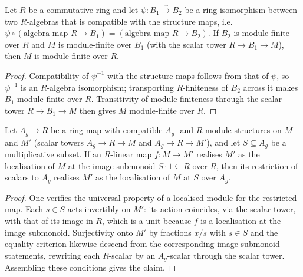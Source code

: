 \begin{lemma}
  \label{lem:gf_finite_of_quotient_ringequiv}
  Let \(R\) be a commutative ring and let \(\psi : B_1 \xrightarrow{\sim} B_2\) be a ring
  isomorphism between two \(R\)-algebras that is compatible with the structure maps, i.e.\
  \(\psi \circ (\text{algebra map } R \to B_1) = (\text{algebra map } R \to B_2)\). If
  \(B_2\) is module-finite over \(R\) and \(M\) is module-finite over \(B_1\) (with the
  scalar tower \(R \to B_1 \to M\)), then \(M\) is module-finite over \(R\).
\end{lemma}
\begin{proof}

\leanok
  Compatibility of \(\psi^{-1}\) with the structure maps follows from that of \(\psi\), so
  \(\psi^{-1}\) is an \(R\)-algebra isomorphism; transporting \(R\)-finiteness of \(B_2\)
  across it makes \(B_1\) module-finite over \(R\). Transitivity of module-finiteness through
  the scalar tower \(R \to B_1 \to M\) then gives \(M\) module-finite over \(R\).
\end{proof}

\begin{lemma}
  \label{lem:gf_islocalizedmodule_restrictscalars}
  Let \(A_g \to R\) be a ring map with compatible \(A_g\)- and \(R\)-module structures on
  \(M\) and \(M'\) (scalar towers \(A_g \to R \to M\) and \(A_g \to R \to M'\)), and let
  \(S \subseteq A_g\) be a multiplicative subset. If an \(R\)-linear map
  \(f : M \to M'\) realises \(M'\) as the localisation of \(M\) at the image submonoid
  \(S \cdot 1 \subseteq R\) over \(R\), then its restriction of scalars to \(A_g\) realises
  \(M'\) as the localisation of \(M\) at \(S\) over \(A_g\).
\end{lemma}
\begin{proof}

\leanok
  One verifies the universal property of a localised module for the restricted map. Each
  \(s \in S\) acts invertibly on \(M'\): its action coincides, via the scalar tower, with
  that of its image in \(R\), which is a unit because \(f\) is a localisation at the image
  submonoid. Surjectivity onto \(M'\) by fractions \(x/s\) with \(s \in S\) and the
  equality criterion likewise descend from the corresponding image-submonoid statements,
  rewriting each \(R\)-scalar by an \(A_g\)-scalar through the scalar tower. Assembling
  these conditions gives the claim.
\end{proof}


